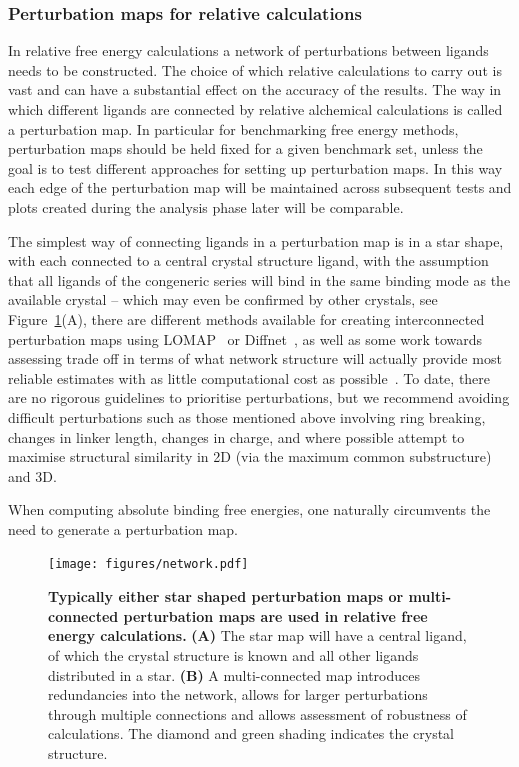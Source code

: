 \documentclass[9pt,bestpractices,pubversion]{livecoms}
\begin{document}
\subsubsection{Perturbation maps for relative calculations}
In relative free energy calculations a network of perturbations between ligands needs to be constructed. The choice of which relative calculations to carry out is vast and can have a substantial effect on the accuracy of the results. The way in which different ligands are connected by relative alchemical calculations is called a perturbation map. In particular for benchmarking free energy methods, perturbation maps should be held fixed for a given benchmark set, unless the goal is to test different approaches for setting up perturbation maps. In this way each edge of the perturbation map will be maintained across subsequent tests and plots created during the analysis phase later will be comparable. 

The simplest way of connecting ligands in a perturbation map is in a star shape, with each connected to a central crystal structure ligand, with the assumption that all ligands of the congeneric series will bind in the same binding mode as the available crystal -- which may even be confirmed by other crystals, see Figure~\ref{fig:map}(A), there are different methods available for creating interconnected perturbation maps using LOMAP~\cite{liu_lead_2013} or Diffnet~\cite{xu_optimal_2019}, as well as some work towards assessing trade off in terms of what network structure will actually provide most reliable estimates with as little computational cost as possible~\cite{yang_optimal_2020, xu_optimal_2019}. To date, there are no rigorous guidelines to prioritise perturbations, but we recommend avoiding difficult perturbations such as those mentioned above involving ring breaking, changes in linker length, changes in charge, and where possible attempt to maximise structural similarity in 2D (via the maximum common substructure) and 3D.

When computing absolute binding free energies, one naturally circumvents the need to generate a perturbation map.

\begin{figure}[!ht]
    \centering
    \texttt{[image: figures/network.pdf]}
    \caption{\textbf{Typically either star shaped perturbation maps or multi-connected perturbation maps are used in relative free energy calculations.} \textbf{(A)} The star map will have a central ligand, of which the crystal structure is known and all other ligands distributed in a star. \textbf{(B)} A multi-connected map introduces redundancies into the network, allows for larger perturbations through multiple connections and allows assessment of robustness of calculations. The diamond and green shading indicates the crystal structure.}
    \label{fig:map}
\end{figure}
\end{document}
